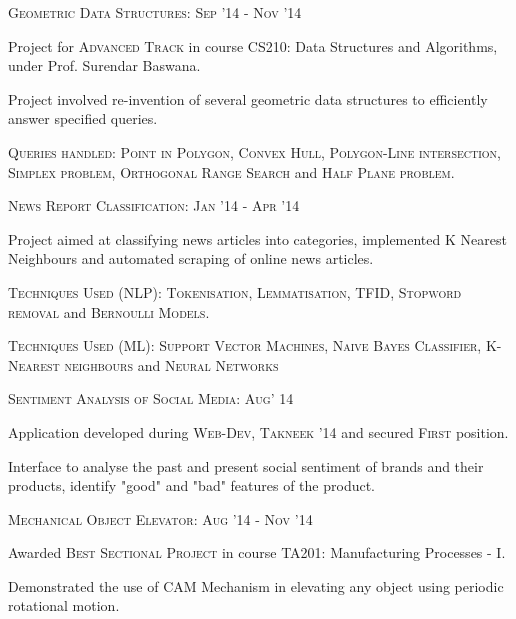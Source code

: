 \documentclass[10pt]{article}
\begin{document}
	\vspace{1mm}
	
	\large{\textsc{Geometric Data Structures:}}   \hfill \small\textsc{Sep '14 - Nov '14}
	\begin{itemize}
	\small
	{
	\item Project for \textsc{Advanced Track} in course CS210: Data Structures and Algorithms, under Prof. Surendar Baswana.
	\item Project involved re-invention of several geometric data structures to efficiently answer specified queries.	
	\item \textsc{Queries handled:} \textsc{Point in Polygon, Convex Hull, Polygon-Line intersection, Simplex problem, Orthogonal Range Search} and \textsc{Half Plane problem}.
	}
	\end{itemize}
 		
	\vspace{1mm}
		
	\large{\textsc{News Report Classification:}}   \hfill \small\textsc{Jan '14 - Apr '14}
	\begin{itemize}
	\small
	{
	\item Project aimed at classifying news articles into categories, implemented K Nearest Neighbours and automated scraping of online news articles.
	\item \textsc{Techniques Used (NLP):} \textsc{Tokenisation, Lemmatisation, TFID, Stopword removal} and \textsc{Bernoulli Models}.
	\item \textsc{Techniques Used (ML):} \textsc{Support Vector Machines, Naive Bayes Classifier, K-Nearest neighbours} and \textsc{Neural Networks}
	}
	\end{itemize}
 		
	\vspace{1mm}
	
	\large{\textsc{Sentiment Analysis of Social Media:}}   \hfill \small\textsc{Aug' 14}
	\begin{itemize}
	\small
	{
	\item Application developed during \textsc{Web-Dev, Takneek '14} and secured \textsc{First} position.
	\item Interface to analyse the past and present social sentiment of brands and their products, identify "good" and "bad" features of the product.
	}
	\end{itemize}
 		
	\vspace{1mm}
	
	\large{\textsc{Mechanical Object Elevator:}}   \hfill \small\textsc{Aug '14 - Nov '14}
	\begin{itemize}
	\small
	{
	\item Awarded \textsc{Best Sectional Project} in course TA201: Manufacturing Processes - I.
	\item Demonstrated the use of \textsc{CAM} Mechanism in elevating any object using periodic rotational motion.
	}
	\end{itemize}
 	
\end{document}
